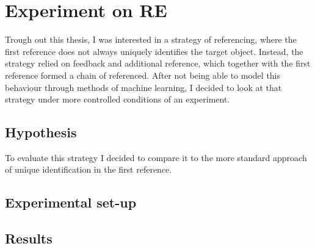 \chapter{Experiment on RE}
Trough out this thesis, I was interested in a strategy of referencing, where the first reference does not always uniquely identifies the target object. Instead, the strategy relied on feedback and additional reference, which together with the first reference formed a chain of referenced. After not being able to model this behaviour through methods of machine learning, I decided to look at that strategy under more controlled conditions of an experiment.

\section{Hypothesis}
To evaluate this strategy I decided to compare it to the more standard approach of unique identification in the first reference.
\section{Experimental set-up}
\section{Results}